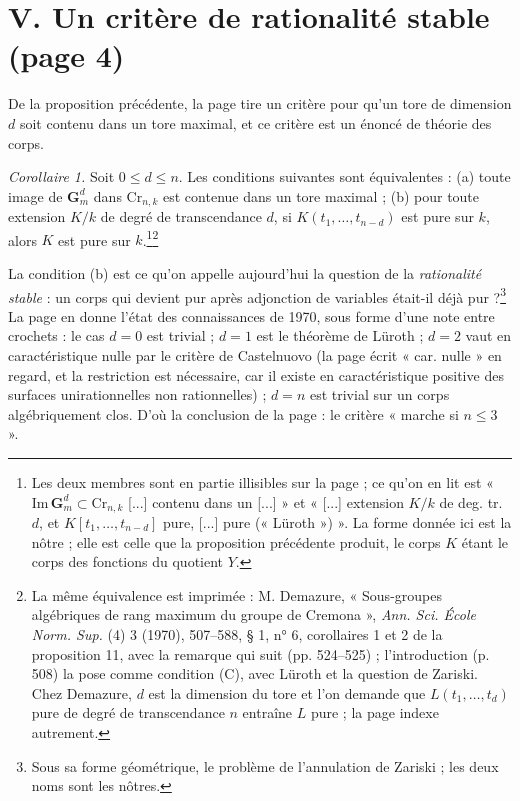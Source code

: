\documentclass[11pt,a4paper]{article}
\begin{document}
\section*{V. Un critère de rationalité stable (page 4)}

De la proposition précédente, la page tire un critère pour qu'un tore de
dimension $d$ soit contenu dans un tore maximal, et ce critère est un énoncé
de théorie des corps.

\emph{Corollaire 1.} Soit $0 \leq d \leq n$. Les conditions suivantes sont
équivalentes : (a) toute image de $\mathbf{G}_m^d$ dans $\mathrm{Cr}_{n,k}$ est
contenue dans un tore maximal ; (b) pour toute extension $K/k$ de degré de
transcendance $d$, si $K(t_1, \ldots, t_{n-d})$ est pure sur $k$, alors $K$ est
pure sur $k$.\footnote{Les deux membres sont en partie illisibles sur la page ;
ce qu'on en lit est « $\mathrm{Im}\,\mathbf{G}_m^d \subset \mathrm{Cr}_{n,k}$
[...] contenu dans un [...] » et « [...] extension $K/k$ de deg. tr. $d$, et
$K[t_1,\ldots,t_{n-d}]$ pure, [...] pure (« Lüroth ») ». La forme donnée ici
est la nôtre ; elle est celle que la proposition précédente produit, le corps
$K$ étant le corps des fonctions du quotient $Y$.}\footnote{La même
équivalence est imprimée : M. Demazure, « Sous-groupes algébriques de rang maximum du groupe de Cremona », \emph{Ann. Sci. École Norm. Sup.} (4) 3 (1970), 507--588, § 1, n° 6, corollaires 1 et 2 de la
proposition 11, avec la remarque qui suit (pp. 524--525) ; l'introduction
(p. 508) la pose comme condition (C), avec Lüroth et la question de Zariski.
Chez Demazure, $d$ est la dimension du tore et l'on demande que
$L(t_1, \ldots, t_d)$ pure de degré de transcendance $n$ entraîne $L$ pure ;
la page indexe autrement.}

La condition (b) est ce qu'on appelle aujourd'hui la question de la
\emph{rationalité stable} : un corps qui devient pur après adjonction de
variables était-il déjà pur ?\footnote{Sous sa forme géométrique, le problème
de l'annulation de Zariski ; les deux noms sont les nôtres.} La page en donne
l'état des connaissances de 1970, sous forme d'une note entre crochets : le cas
$d = 0$ est trivial ; $d = 1$ est le théorème de Lüroth ; $d = 2$ vaut en
caractéristique nulle par le critère de Castelnuovo (la page écrit « car.
nulle » en regard, et la restriction est nécessaire, car il existe en
caractéristique positive des surfaces unirationnelles non rationnelles) ; $d =
n$ est trivial sur un corps algébriquement clos. D'où la conclusion de la page :
le critère « marche si $n \leq 3$ ».
\end{document}
